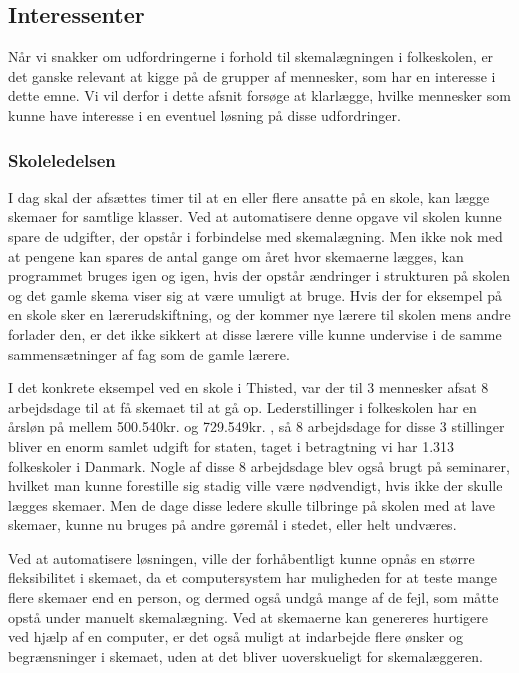 \subsection{Interessenter}
Når vi snakker om udfordringerne i forhold til skemalægningen i folkeskolen, er det ganske relevant at kigge på de grupper af mennesker, som har en interesse i dette emne. Vi vil derfor i dette afsnit forsøge at klarlægge, hvilke mennesker som kunne have interesse i en eventuel løsning på disse udfordringer.

\subsubsection{Skoleledelsen}
I dag skal der afsættes timer til at en eller flere ansatte på en skole, kan lægge skemaer for samtlige klasser. Ved at automatisere denne opgave vil skolen kunne spare de udgifter, der opstår i forbindelse med skemalægning. Men ikke nok med at pengene kan spares de antal gange om året hvor skemaerne lægges, kan programmet bruges igen og igen, hvis der opstår ændringer i strukturen på skolen og det gamle skema viser sig at være umuligt at bruge. Hvis der for eksempel på en skole sker en lærerudskiftning, og der kommer nye lærere til skolen mens andre forlader den, er det ikke sikkert at disse lærere ville kunne undervise i de samme sammensætninger af fag som de gamle lærere.

I det konkrete eksempel ved en skole i Thisted, var der til 3 mennesker afsat 8 arbejdsdage til at få skemaet til at gå op. Lederstillinger i folkeskolen har en årsløn på mellem 500.540kr. og 729.549kr. \cite{Statens_adm}\cite{TR_HAANDBOGEN}, så 8 arbejdsdage for disse 3 stillinger bliver en enorm samlet udgift for staten, taget i betragtning vi har 1.313 folkeskoler i Danmark\cite{UVM-Folkeskoler}. Nogle af disse 8 arbejdsdage blev også brugt på seminarer, hvilket man kunne forestille sig stadig ville være nødvendigt, hvis ikke der skulle lægges skemaer. Men de dage disse ledere skulle tilbringe på skolen med at lave skemaer, kunne nu bruges på andre gøremål i stedet, eller helt undværes.

Ved at automatisere løsningen, ville der forhåbentligt kunne opnås en større fleksibilitet i skemaet, da et computersystem har muligheden for at teste mange flere skemaer end en person, og dermed også undgå mange af de fejl, som måtte opstå under manuelt skemalægning. Ved at skemaerne kan genereres hurtigere ved hjælp af en computer, er det også muligt at indarbejde flere ønsker og begrænsninger i skemaet, uden at det bliver uoverskueligt for skemalæggeren. 

